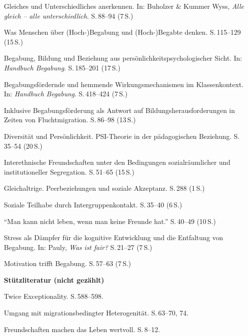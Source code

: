 \documentclass[ngerman, a4paper]{article}
\begin{document}
\begin{litdesc}
  \item[\cite{grossrieder2010anerkennung}] Gleiches und Unterschiedliches
    anerkennen. In: Buholzer \& Kummer Wyss,
    \textit{Alle gleich -- alle unterschiedlich}. S.\,88--94 (7\,S.)
  \item[\cite{baudson2021wasdenken}] Was Menschen über
    (Hoch-)Begabung und (Hoch-)Begabte denken. S.\,115--129 (15\,S.)
  \item[\cite{kuhl2021begabungbildungbeziehung}] Begabung, Bildung
    und Beziehung aus persönlichkeitspsychologischer Sicht.
    In: \textit{Handbuch Begabung}.
    S.\,185--201 (17\,S.)
  \item[\cite{wagener2021bfhemmendfoerdernd}] Begabungsfördernde und
    hemmende Wirkungsmechanismen im Klassenkontext.
    In: \textit{Handbuch Begabung}.
    S.\,418--424 (7\,S.)
  \item[\cite{behrensen2019inklusive}] Inklusive Begabungsförderung als Antwort
    auf Bildungsherausforderungen in Zeiten von Fluchtmigration.
    S.\,86--98 (13\,S.)
  \item[\cite{kuhl2019diversitaet}] Diversität und Persönlichkeit.
    PSI-Theorie in der pädagogischen Beziehung. S.\,35--54 (20\,S.)
  \item[\cite{boosnuenning2022interethnisch}] Interethnische Freundschaften
    unter den Bedingungen sozialräumlicher und institutioneller Segregation.
    S.\,51--65 (15\,S.)
  \item[\cite{kesselshannover2015gleichaltrige}] Gleichaltrige.
    Peerbeziehungen und soziale Akzeptanz. S.\,288 (1\,S.)
  \item[\cite{tschoppbuholzergruetter2022intergruppenkontakt}]
    Soziale Teilhabe durch Intergruppenkontakt. S.\,35--40 (6\,S.)
  \item[\cite{baumert2022freundschaftwerte}] \enquote{Man kann nicht leben,
    wenn man keine Freunde hat.} S.\,40--49 (10\,S.)
  \item[\cite{evers2025stress}] Stress als Dämpfer für die kognitive
    Entwicklung und die Entfaltung von Begabung.
    In: Pauly, \textit{Was ist fair?} S.\,21--27 (7\,S.)
  \item[\cite{lehwald2017motivation}] Motivation trifft Begabung.
    S.\,57--63 (7\,S.)
\end{litdesc}
 
\textbf{Stützliteratur (nicht gezählt)}

\begin{litdesc}
  \item[\cite{baumschader2021twice}] Twice Exceptionality. S.\,588--598.
  \item[\cite{kappus2010migration}] Umgang mit migrationsbedingter
    Heterogenität. S.\,63--70, 74.
  \item[\cite{gysinscherzinger2022freundschaftenwertvoll}]
    Freundschaften machen das Leben wertvoll. S.\,8--12.
\end{litdesc}
 
\end{document}
